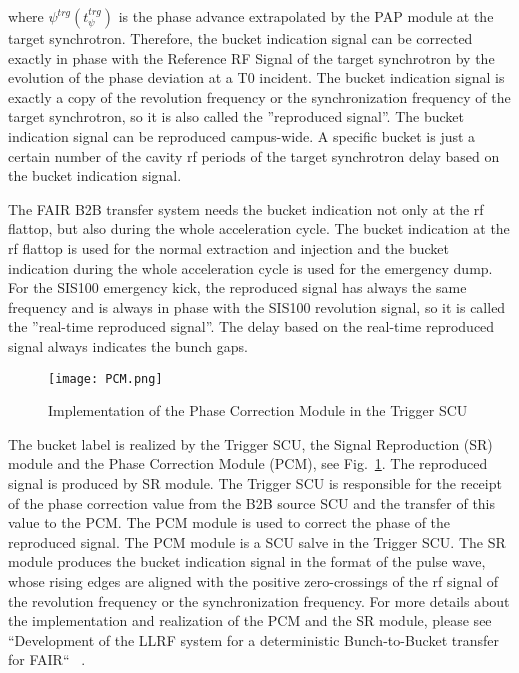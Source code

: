 where $\psi^\mathit{trg}(t_\mathit{\psi}^\mathit{trg})$ is the phase advance extrapolated by the PAP module at the target synchrotron.
Therefore, the bucket indication signal can be corrected exactly in phase with the Reference RF Signal of the target synchrotron by the evolution of the phase deviation at a T0 incident. The bucket indication signal is exactly a copy of the revolution frequency or the synchronization frequency of the target synchrotron, so
it is also called the ”reproduced signal”. The bucket indication signal can be reproduced campus-wide. A specific bucket is just a certain number of the cavity rf periods of the target synchrotron delay based on the bucket indication signal.






The FAIR B2B transfer system needs the bucket indication not only at the rf flattop, but also during the whole acceleration cycle. The bucket indication at the rf flattop is used for the normal extraction and injection and the bucket indication during the whole acceleration cycle is used for the emergency dump. For the SIS100 emergency kick, the reproduced signal has always the same frequency and is always in phase with the SIS100 revolution signal, so it is called the ''real-time reproduced signal''. The delay based on the real-time reproduced signal always indicates the bunch gaps.


 \begin{figure}[!htb]
   \centering   
   \texttt{[image: PCM.png]}
   \caption{Implementation of the Phase Correction Module in the Trigger SCU}
   \label{PCM}
\end{figure}
The bucket label is realized by the Trigger SCU, the Signal Reproduction (SR) module and the Phase Correction Module (PCM), see Fig.~\ref{PCM}. The reproduced signal is produced by SR module. The Trigger SCU is responsible for the receipt of the phase correction value from the B2B source SCU and the transfer of this value to the PCM. The PCM module is used to correct the phase of the reproduced signal. The PCM module is a SCU salve in the Trigger SCU. The SR module produces the bucket indication signal in the format of the pulse wave, whose rising edges are aligned with the positive zero-crossings of the rf signal of the revolution frequency or the synchronization frequency. For more details about the implementation and realization of the PCM and the SR module, please see ``Development of the LLRF system for a deterministic Bunch-to-Bucket transfer for FAIR`` ~\cite{ferrand_development_????}. 

